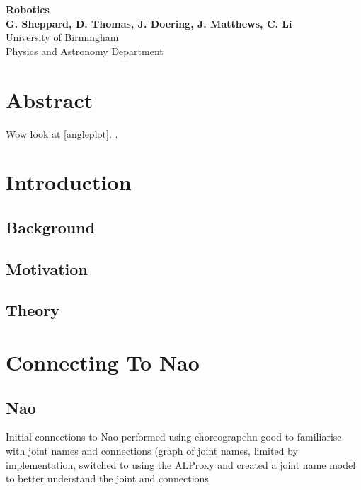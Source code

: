 \documentclass[11pt]{article}
\begin{document}
\begin{titlepage}

    \begin{center}
        \vspace*{1cm}
        \Huge
        \textbf{Robotics} \\
        \vspace{0.5cm}
        \LARGE
        \vspace{1.5cm}
        \textbf{G. Sheppard, D. Thomas, J. Doering, J. Matthews, C. Li} \\
        \vfill
        \vspace{0.8cm}
        \Large
        University of Birmingham\\
        Physics and Astronomy Department\\
    \end{center}
\end{titlepage}

\tableofcontents

\section{Abstract}
Wow look at \ref{angleplot}. \cite{Bae2006}.

\section{Introduction}
\subsection{Background}
\subsection{Motivation}
\subsection{Theory}

\section{Connecting To Nao}

\subsection{Nao}
Initial connections to Nao performed using choreograpehn good to familiarise with joint names and connections (graph of joint names, limited by implementation, switched to using the ALProxy and created a joint name model to better understand the joint and connections
\end{document}
